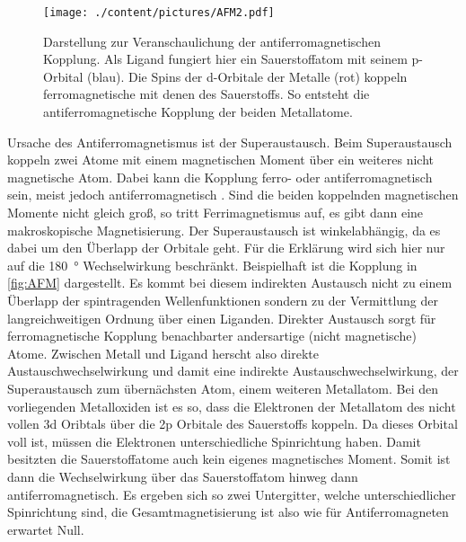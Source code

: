         \begin{figure}
            \centering
            \texttt{[image: ./content/pictures/AFM2.pdf]}
            \caption{Darstellung zur Veranschaulichung der antiferromagnetischen Kopplung.
            Als Ligand fungiert hier ein Sauerstoffatom mit seinem p-Orbital (blau).
            Die Spins der d-Orbitale der Metalle (rot) koppeln ferromagnetische mit denen des Sauerstoffs.
            So entsteht die antiferromagnetische Kopplung der beiden Metallatome.}
            \label{fig:AFM}
        \end{figure}
        Ursache des Antiferromagnetismus ist der Superaustausch.
        Beim Superaustausch koppeln zwei Atome mit einem magnetischen Moment über ein weiteres nicht magnetische Atom. 
        Dabei kann die Kopplung ferro- oder antiferromagnetisch sein, meist jedoch antiferromagnetisch \cite{AFM_1}.
        Sind die beiden koppelnden magnetischen Momente nicht gleich groß, so tritt Ferrimagnetismus auf, es gibt dann eine makroskopische Magnetisierung.
        Der Superaustausch ist winkelabhängig, da es dabei um den Überlapp der Orbitale geht.
        Für die Erklärung wird sich hier nur auf die \SI{180}{\degree} Wechselwirkung beschränkt.
        Beispielhaft ist die Kopplung in \autoref{fig:AFM} dargestellt.
        Es kommt bei diesem indirekten Austausch nicht zu einem Überlapp der spintragenden Wellenfunktionen sondern zu der Vermittlung der langreichweitigen Ordnung über einen Liganden.
        Direkter Austausch sorgt für ferromagnetische Kopplung benachbarter andersartige (nicht magnetische) Atome.
        Zwischen Metall und Ligand herscht also direkte Austauschwechselwirkung und damit eine indirekte Austauschwechselwirkung, der Superaustausch zum übernächsten Atom, einem weiteren Metallatom.
        Bei den vorliegenden Metalloxiden ist es so, dass die Elektronen der Metallatom des nicht vollen 3d Oribtals über die 2p Orbitale des Sauerstoffs koppeln.
        Da dieses Orbital voll ist, müssen die Elektronen unterschiedliche Spinrichtung haben.
        Damit besitzten die Sauerstoffatome auch kein eigenes magnetisches Moment.
        Somit ist dann die Wechselwirkung über das Sauerstoffatom hinweg dann antiferromagnetisch.
        Es ergeben sich so zwei Untergitter, welche unterschiedlicher Spinrichtung sind, die Gesamtmagnetisierung ist also wie für Antiferromagneten erwartet Null.
            
